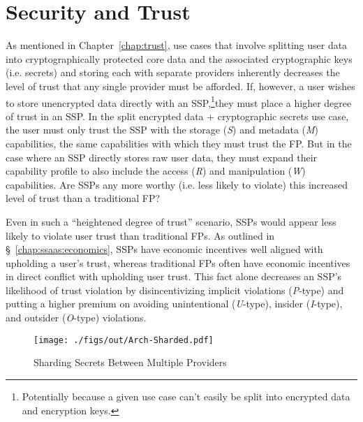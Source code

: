 \section{Security and Trust}
\label{chap:ssaas:trust}

As mentioned in Chapter~\ref{chap:trust}, use cases that involve
splitting user data into cryptographically protected core data and the
associated cryptographic keys (i.e. secrets) and storing each with
separate providers inherently decreases the level of trust that any
single provider must be afforded. If, however, a user wishes to store
unencrypted data directly with an SSP,\footnote{Potentially because a
  given use case can't easily be split into encrypted data and
  encryption keys.}they must place a higher degree of trust in an
SSP. In the split encrypted data + cryptographic secrets use case, the
user must only trust the SSP with the storage (\emph{S}) and metadata
(\emph{M}) capabilities, the same capabilities with which they must
trust the FP. But in the case where an SSP directly stores raw user
data, they must expand their capability profile to also include the
access (\emph{R}) and manipulation (\emph{W}) capabilities. Are SSPs
any more worthy (i.e. less likely to violate) this increased level of
trust than a traditional FP?

Even in such a ``heightened degree of trust'' scenario, SSPs would
appear less likely to violate user trust than traditional FPs. As
outlined in \S~\ref{chap:ssaas:economics}, SSPs have economic
incentives well aligned with upholding a user's trust, whereas
traditional FPs often have economic incentives in direct conflict with
upholding user trust. This fact alone decreases an SSP's likelihood of
trust violation by disincentivizing implicit violations
(\emph{P}-type) and putting a higher premium on avoiding unintentional
(\emph{U}-type), insider (\emph{I}-type), and outsider (\emph{O}-type)
violations.

\begin{figure}[t]
  \centering
  \texttt{[image: ./figs/out/Arch-Sharded.pdf]}
  \caption{Sharding Secrets Between Multiple Providers}
  \label{fig:ssaas-sharded}
\end{figure}

